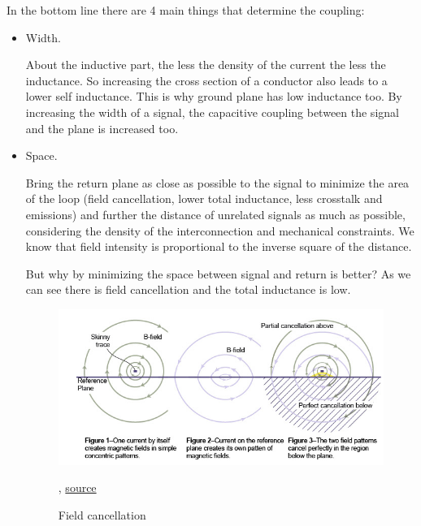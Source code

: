 \documentclass[12pt]{article}
\begin{document}


In the bottom line there are 4 main things that determine the coupling:

\begin{itemize}
	\item Width.
	

About the inductive part, the less the density of the current the less the inductance. So increasing the cross section of a conductor also leads to a lower self inductance. This is why ground plane has low inductance too. By increasing the width of a signal, the capacitive coupling between the signal and the plane is increased too.
	\item Space.
	
Bring the return plane as close as possible to the signal to minimize the area of the loop (field cancellation, lower total inductance, less crosstalk and emissions) and further the distance of unrelated signals as much as possible, considering the density of the interconnection and mechanical constraints. We know that field intensity is proportional to the inverse square of the distance.

But why by minimizing the space between signal and return is better? As we can see there is field cancellation and the total inductance is low. 

	\begin{figure}[h!]
	\centering
	\includegraphics[keepaspectratio, width = \textwidth]{assets/field_cancellation.png}	
	\caption{Field cancellation}, \href{http://www.signalintegrity.com/Pubs/edn/FieldCancellation.htm}{source}
	\end{figure}


\end{itemize}
\end{document}
